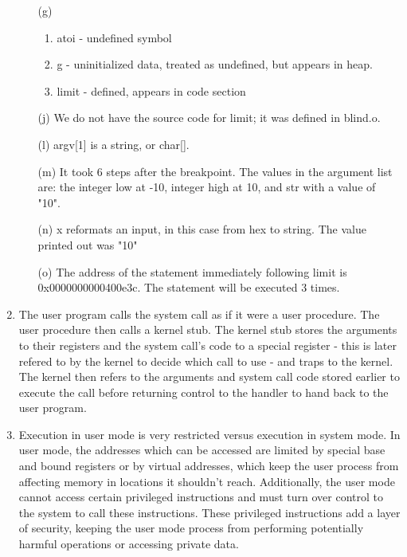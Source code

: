 \documentclass[12pt,letterpaper]{report}
\begin{document}
\begin{enumerate}
\begin{enumerate}
\item[(g)] 
\begin{enumerate}
\item atoi - undefined symbol
\item g - uninitialized data, treated as undefined, but appears in heap.
\item limit - defined, appears in code section
\end{enumerate}
\item[(j)] We do not have the source code for limit; it was defined in blind.o.
\item[(l)] argv[1] is a string, or char[].
\item[(m)] It took 6 steps after the breakpoint. The values in the argument list are: the integer low at -10, integer high at 10, and str with a value of "10".
\item[(n)] x reformats an input, in this case from hex to string. The value printed out was "10"
\item[(o)] The address of the statement immediately following limit is  0x0000000000400e3c. The statement will be executed 3 times.
\end{enumerate}

\item The user program calls the system call as if it were a user procedure. The user procedure then calls a kernel stub. The kernel stub stores the arguments to their registers and the system call's code to a special register - this is later refered to by the kernel to decide which call to use - and traps to the kernel. The kernel then refers to the arguments and system call code stored earlier to execute the call before returning control to the handler to hand back to the user program.

\item Execution in user mode is very restricted versus execution in system mode. In user mode, the addresses which can be accessed are limited by special base and bound registers or by virtual addresses, which keep the user process from affecting memory in locations it shouldn't reach. Additionally, the user mode cannot access certain privileged instructions and must turn over control to the system to call these instructions. These privileged instructions add a layer of security, keeping the user mode process from performing potentially harmful operations or accessing private data.


\end{enumerate}
\end{document}
